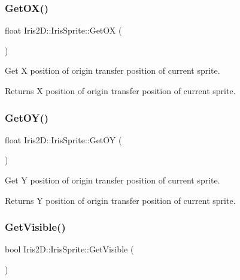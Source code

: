\subsubsection{\texorpdfstring{Get\+O\+X()}{GetOX()}}
{\footnotesize\ttfamily float Iris2\+D\+::\+Iris\+Sprite\+::\+Get\+OX (\begin{DoxyParamCaption}{ }\end{DoxyParamCaption})}



Get X position of origin transfer position of current sprite. 

\begin{DoxyReturn}{Returns}
X position of origin transfer position of current sprite. 
\end{DoxyReturn}
\mbox{\label{class_iris2_d_1_1_iris_sprite_adfdf12a18ff5237e1b27b63c2a27adaf}} 
\subsubsection{\texorpdfstring{Get\+O\+Y()}{GetOY()}}
{\footnotesize\ttfamily float Iris2\+D\+::\+Iris\+Sprite\+::\+Get\+OY (\begin{DoxyParamCaption}{ }\end{DoxyParamCaption})}



Get Y position of origin transfer position of current sprite. 

\begin{DoxyReturn}{Returns}
Y position of origin transfer position of current sprite. 
\end{DoxyReturn}
\mbox{\label{class_iris2_d_1_1_iris_sprite_afb65bc13767cb566233cf4c14b4288bd}} 
\subsubsection{\texorpdfstring{Get\+Visible()}{GetVisible()}}
{\footnotesize\ttfamily bool Iris2\+D\+::\+Iris\+Sprite\+::\+Get\+Visible (\begin{DoxyParamCaption}{ }\end{DoxyParamCaption})}



